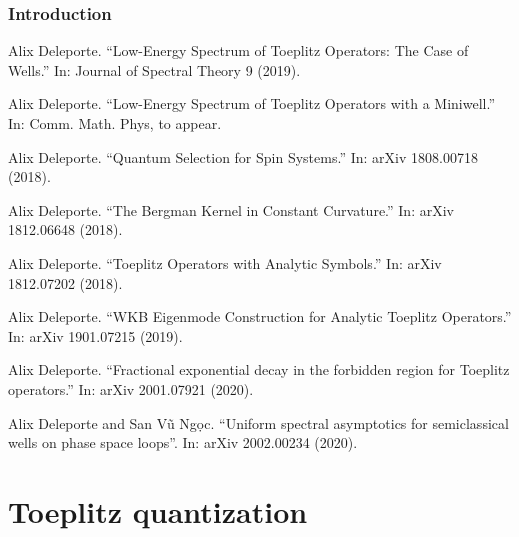 \documentclass[mathserif]{beamer}
\begin{document}
      \begin{frame}
        \frametitle{Introduction}
        {\footnotesize
        \begin{description}
        \item<1>[{[D. 2019]}] Alix Deleporte. “Low-Energy Spectrum of Toeplitz Operators: The Case
of Wells.” In: Journal of Spectral Theory 9 (2019).
\item<1-2> [{[D. 2020?]}] Alix Deleporte. “Low-Energy Spectrum of Toeplitz Operators with a
Miniwell.” In: Comm. Math. Phys, to appear.
\item<1>[{[D. 2018a++]}] Alix Deleporte. “Quantum Selection for Spin Systems.” In: arXiv
1808.00718 (2018).
\item<1>[{[D. 2018b++]}] Alix Deleporte. “The Bergman Kernel in Constant Curvature.” In:
arXiv 1812.06648 (2018).
\item<1-2>[{[D. 2018c++]}] Alix Deleporte. “Toeplitz Operators with Analytic Symbols.” In: arXiv
1812.07202 (2018).
\item<1>[{[D. 2019++]}] Alix Deleporte. “WKB Eigenmode Construction for Analytic Toeplitz
  Operators.” In: arXiv 1901.07215 (2019).
  \item<1-2>[{[D. 2020a++]}] Alix Deleporte. ``Fractional exponential
    decay in the forbidden region for Toeplitz operators.'' In: arXiv
    2001.07921 (2020).
  \item<1>[{[DV 2020b++]}] Alix Deleporte and San Vũ Ng\d{o}c. ``Uniform spectral asymptotics for semiclassical
wells on phase space loops''. In: arXiv 2002.00234 (2020).
        \end{description}}
      \end{frame}

    
\section{Toeplitz quantization}

\end{document}
